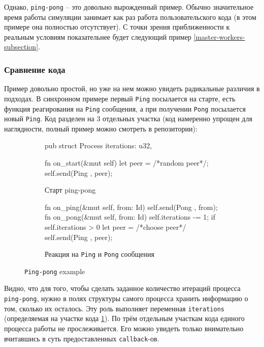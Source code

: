 Однако, \texttt{ping-pong} -- это довольно вырожденный пример. Обычно значительное время работы симуляции занимает как раз работа пользовательского кода (в этом примере она полностью отсутствует). С точки зрения приближенности к реальным условиям показательнее будет следующий пример \ref{master-workers-subsection}. 

\subsubsection{Сравнение кода}

Пример довольно простой, но уже на нем можно увидеть радикальные различия в подходах. В синхронном примере первый \texttt{Ping} посылается на старте, есть функция реагирования на \texttt{Ping} сообщения, а при получении \texttt{Pong} посылается новый \texttt{Ping}. Код разделен на 3 отдельных участка (код намеренно упрощен для наглядности, полный пример можно смотреть в репозитории\cite{async-ping-pong-example}): 

\begin{figure}[H]
    \centering
    \begin{subfigure}[b]{0.40\linewidth}
        \footnotesize
        \centering
        \begin{rustcode}
pub struct Process {
  iterations: u32,
}

fn on_start(&mut self) {
  let peer = /*random peer*/;
  self.send(Ping {}, peer);
}
    \end{rustcode}
        \caption{Старт ping-pong}
        \label{start-ping-pong}
    \end{subfigure}
    \hfill
    \begin{subfigure}[b]{0.51\linewidth}
        \footnotesize
        \centering
        \begin{rustcode}
fn on_ping(&mut self, from: Id) {
  self.send(Pong {}, from);
}        
fn on_pong(&mut self, from: Id) {
  self.iterations -= 1;
  if self.iterations > 0 {
    let peer = /*choose peer*/
    self.send(Ping {}, peer);
  }
}
    \end{rustcode}
        \caption{Реакция на \texttt{Ping} и \texttt{Pong} сообщения}
        \label{ping-pong-on-pong}
    \end{subfigure}
\caption{\texttt{Ping-pong} example}
\label{ping-pong-code}
\end{figure}

Видно, что для того, чтобы сделать заданное количество итераций процесса \texttt{ping-pong}, нужно в полях структуры самого процесса хранить информацию о том, сколько их осталось. Эту роль выполняет переменная \texttt{iterations} (определяемая на участке кода \ref{start-ping-pong}). По трём отдельным участкам кода единого процесса работы не прослеживается. Его можно увидеть только внимательно вчитавшись в суть предоставленных \texttt{callback}-ов.

